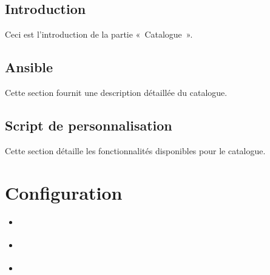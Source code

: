 \documentclass[letterpaper,10pt,french]{sphinxmanual}
\begin{document}
\subsection{Introduction}
\label{\detokenize{doc_instal/installation:introduction}}
\sphinxAtStartPar
Ceci est l’introduction de la partie « Catalogue ».


\subsection{Ansible}
\label{\detokenize{doc_instal/installation:ansible}}
\sphinxAtStartPar
Cette section fournit une description détaillée du catalogue.


\subsection{Script de personnalisation}
\label{\detokenize{doc_instal/installation:script-de-personnalisation}}
\sphinxAtStartPar
Cette section détaille les fonctionnalités disponibles pour le catalogue.

\sphinxstepscope


\section{Configuration}
\label{\detokenize{doc_instal/configuration:configuration}}\label{\detokenize{doc_instal/configuration::doc}}
\begin{sphinxShadowBox}
\begin{itemize}
\item {} 
\sphinxAtStartPar
{}\label{\detokenize{doc_instal/configuration:id1}}{\hyperref[\detokenize{doc_instal/configuration:introduction}]{}}

\item {} 
\sphinxAtStartPar
{}\label{\detokenize{doc_instal/configuration:id2}}{\hyperref[\detokenize{doc_instal/configuration:chaque-module}]{}}

\item {} 
\sphinxAtStartPar
{}\label{\detokenize{doc_instal/configuration:id3}}{\hyperref[\detokenize{doc_instal/configuration:relancer-l-installation}]{}}

\end{itemize}
\end{sphinxShadowBox}
\end{document}
